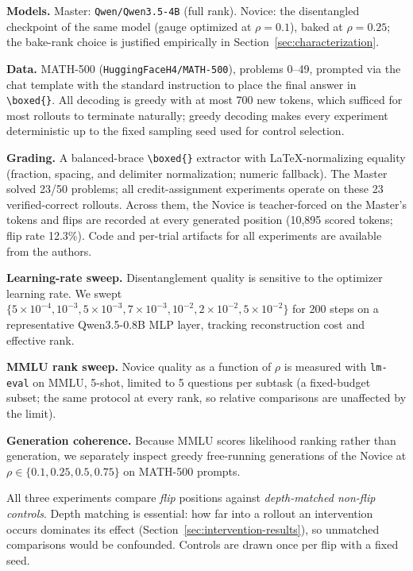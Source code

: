 \documentclass[times, 10pt,twocolumn]{article}
\begin{document}


\textbf{Models.} Master: \texttt{Qwen/Qwen3.5-4B} (full rank). Novice: the
disentangled checkpoint of the same model (gauge optimized at $\rho{=}0.1$),
baked at $\rho{=}0.25$; the bake-rank choice is justified empirically in
Section~\ref{sec:characterization}.

\textbf{Data.} MATH-500 (\texttt{HuggingFaceH4/MATH-500}), problems 0--49,
prompted via the chat template with the standard instruction to place the
final answer in \texttt{\textbackslash boxed\{\}}. All decoding is greedy with
at most 700 new tokens, which sufficed for most rollouts to terminate
naturally; greedy decoding makes every experiment deterministic up to the
fixed sampling seed used for control selection.

\textbf{Grading.} A balanced-brace \texttt{\textbackslash boxed\{\}} extractor
with LaTeX-normalizing equality (fraction, spacing, and delimiter
normalization; numeric fallback). The Master solved 23/50 problems; all
credit-assignment experiments operate on these 23 verified-correct rollouts.
Across them, the Novice is teacher-forced on the Master's tokens and flips are
recorded at every generated position (10{,}895 scored tokens; flip rate
12.3\%). Code and per-trial artifacts for all experiments are available from
the authors.


\textbf{Learning-rate sweep.} Disentanglement quality is sensitive to the
optimizer learning rate. We swept
$\{5{\times}10^{-4}, 10^{-3}, 5{\times}10^{-3}, 7{\times}10^{-3}, 10^{-2},
2{\times}10^{-2}, 5{\times}10^{-2}\}$ for 200 steps on a representative
Qwen3.5-0.8B MLP layer, tracking reconstruction cost and effective rank.

\textbf{MMLU rank sweep.} Novice quality as a function of $\rho$ is measured
with \texttt{lm-eval} on MMLU, 5-shot, limited to 5 questions per subtask
(a fixed-budget subset; the same protocol at every rank, so relative
comparisons are unaffected by the limit).

\textbf{Generation coherence.} Because MMLU scores likelihood ranking rather
than generation, we separately inspect greedy free-running generations of the
Novice at $\rho \in \{0.1, 0.25, 0.5, 0.75\}$ on MATH-500 prompts.


All three experiments compare \emph{flip} positions against \emph{depth-matched
non-flip controls}. Depth matching is essential: how far into a rollout an
intervention occurs dominates its effect
(Section~\ref{sec:intervention-results}), so unmatched comparisons would be
confounded. Controls are drawn once per flip with a fixed seed.
\end{document}
